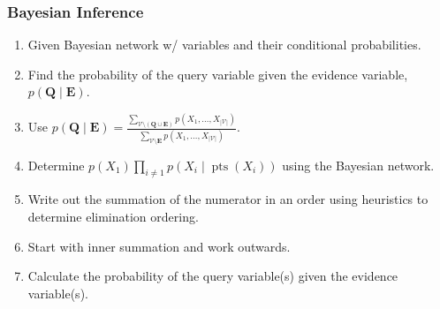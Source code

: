 \subsubsection{Bayesian Inference}
\begin{process}
    \begin{enumerate}
        \item Given Bayesian network w/ variables and their conditional probabilities.
        \item Find the probability of the query variable given the evidence variable, $p(\mathbf{Q} \mid \mathbf{E})$.
        \item Use $p(\mathbf{Q} \mid \mathbf{E}) = \frac{\sum_{\mathcal{V} \setminus (\mathbf{Q} \cup \mathbf{E})} p(X_1, \dots, X_{|\mathcal{V}|})}{\sum_{\mathcal{V} \setminus \mathbf{E}} p(X_1, \dots, X_{|\mathcal{V}|})}$.
        \item Determine $p(X_1) \prod_{i \neq 1} p(X_i \mid \operatorname{pts}(X_i))$ using the Bayesian network. 
        \item Write out the summation of the numerator in an order using heuristics to determine elimination ordering. 
        \item Start with inner summation and work outwards.
        \item Calculate the probability of the query variable(s) given the evidence variable(s).
    \end{enumerate}
\end{process}

